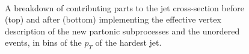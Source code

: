 \begin{figure}[H] 
\centering
{} \\
\caption{A breakdown of contributing parts to the jet cross-section before (top) and after (bottom) implementing the effective vertex description of the new partonic subprocesses and the unordered events, in bins of the $p_T$ of the hardest jet.}
\label{fig:fklmigration2}
\end{figure}

